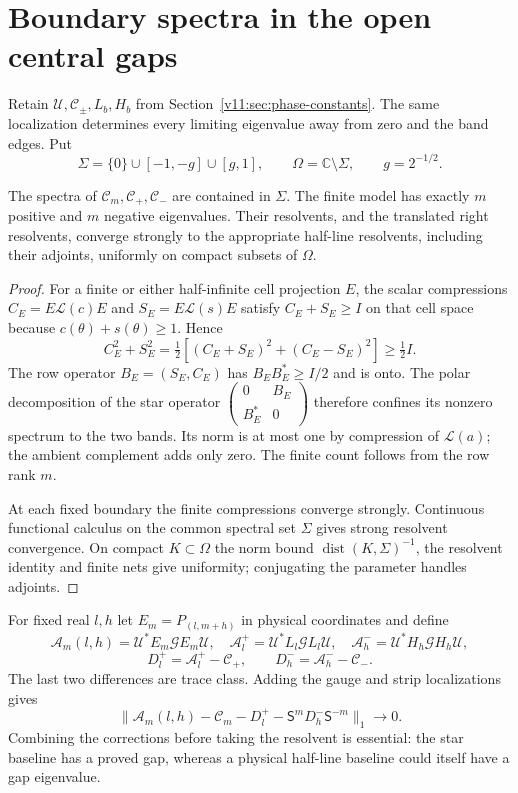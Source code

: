 \section{Boundary spectra in the open central gaps}
\label{v11:sec:gap-limits}

Retain $\mathscr U,\mathscr C_\pm,L_b,H_b$ from
Section~\ref{v11:sec:phase-constants}. The same localization determines
every limiting eigenvalue away from zero and the band edges. Put
\[
 \Sigma=\{0\}\cup[-1,-g]\cup[g,1],\qquad
 \Omega=\mathbb C\setminus\Sigma,\qquad g=2^{-1/2}.
\]

\begin{lemma}\label{v11:lem:model-gap}
The spectra of $\mathscr C_m,\mathscr C_+,\mathscr C_-$ are contained
in $\Sigma$.  The finite model has exactly $m$ positive and $m$ negative
eigenvalues.  Their resolvents, and the translated right resolvents,
converge strongly to the appropriate half-line resolvents, including
their adjoints, uniformly on compact subsets of $\Omega$.
\end{lemma}
\begin{proof}
For a finite or either half-infinite cell projection $E$, the scalar
compressions $C_E=E\mathcal L(c)E$ and $S_E=E\mathcal L(s)E$ satisfy
$C_E+S_E\ge I$ on that cell space because
$c(\theta)+s(\theta)\ge1$.  Hence
\[
 C_E^2+S_E^2
 =\tfrac12[(C_E+S_E)^2+(C_E-S_E)^2]\ge\tfrac12I.
\]
The row operator $B_E=(S_E,C_E)$ has $B_EB_E^*\ge I/2$ and is onto.
The polar decomposition of the star operator
$\left(\begin{smallmatrix}0&B_E\\B_E^*&0\end{smallmatrix}\right)$
therefore confines its nonzero spectrum to the two bands.  Its norm is
at most one by compression of $\mathcal L(a)$; the ambient complement
adds only zero.  The finite count follows from the row rank $m$.

At each fixed boundary the finite compressions converge strongly.
Continuous functional calculus on the common spectral set $\Sigma$
gives strong resolvent convergence. On compact $K\subset\Omega$ the
norm bound $\operatorname{dist}(K,\Sigma)^{-1}$, the resolvent identity
and finite nets give uniformity; conjugating the parameter handles
adjoints.
\end{proof}

For fixed real $l,h$ let $E_m=P_{(l,m+h)}$ in physical coordinates and
define
\[
 \mathscr A_m(l,h)=\mathscr U^*E_m\mathcal G E_m\mathscr U,
 \quad
 \mathscr A_l^+=\mathscr U^*L_l\mathcal G L_l\mathscr U,
 \quad
 \mathscr A_h^-=\mathscr U^*H_h\mathcal G H_h\mathscr U,
\]
\[
 D_l^+=\mathscr A_l^+-\mathscr C_+,
 \qquad D_h^-=\mathscr A_h^--\mathscr C_-.
\]
The last two differences are trace class.  Adding the gauge and strip
localizations gives
\begin{equation}\label{v11:eq:combined-gap-localization}
 \|\mathscr A_m(l,h)-\mathscr C_m-D_l^+
                  -\mathsf S^mD_h^-\mathsf S^{-m}\|_1\to0.
\end{equation}
Combining the corrections before taking the resolvent is essential:
the star baseline has a proved gap, whereas a physical half-line
baseline could itself have a gap eigenvalue.

